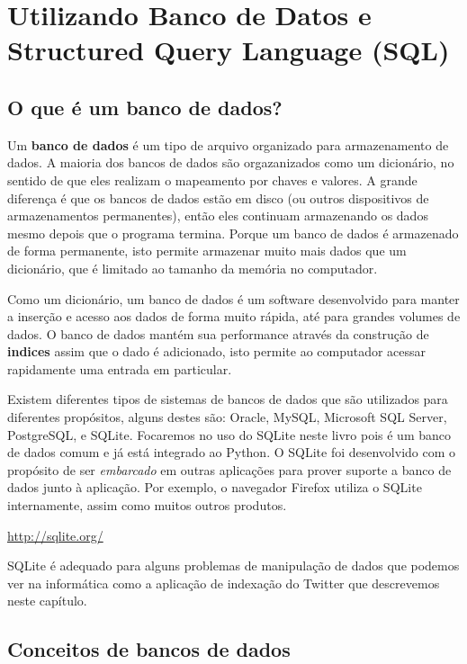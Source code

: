 
\chapter{Utilizando Banco de Datos e Structured Query Language (SQL)}

\section{O que é um banco de dados?}

Um {\bf banco de dados} é um tipo de arquivo organizado para armazenamento de
dados. A maioria dos bancos de dados são orgazanizados como um dicionário, no
sentido de que eles realizam o mapeamento por chaves e valores. A grande
diferença é que os bancos de dados estão em disco (ou outros dispositivos de
armazenamentos permanentes), então eles continuam armazenando os dados mesmo
depois que o programa termina. Porque um banco de dados é armazenado de forma
permanente, isto permite armazenar muito mais dados que um dicionário, que é
limitado ao tamanho da memória no computador.


Como um dicionário, um banco de dados é um software desenvolvido para manter a
inserção e acesso aos dados de forma muito rápida, até para grandes volumes de
dados. O banco de dados mantém sua performance através da construção de
{\bf indices} assim que o dado é adicionado, isto permite ao computador acessar
rapidamente uma entrada em particular.

Existem diferentes tipos de sistemas de bancos de dados que são utilizados 
para diferentes propósitos, alguns destes são: Oracle, MySQL, Microsoft SQL
Server, PostgreSQL, e SQLite. Focaremos no uso do SQLite neste livro pois é
um banco de dados comum e já está integrado ao Python. O SQLite foi
desenvolvido com o propósito de ser \emph{embarcado} em outras aplicações para
prover suporte a banco de dados junto à aplicação. Por exemplo, o navegador
Firefox utiliza o SQLite internamente, assim como muitos outros produtos.

\url{http://sqlite.org/}

SQLite é adequado para alguns problemas de manipulação de dados que podemos
ver na informática como a aplicação de indexação do Twitter que descrevemos
neste capítulo.

\section{Conceitos de bancos de dados}

